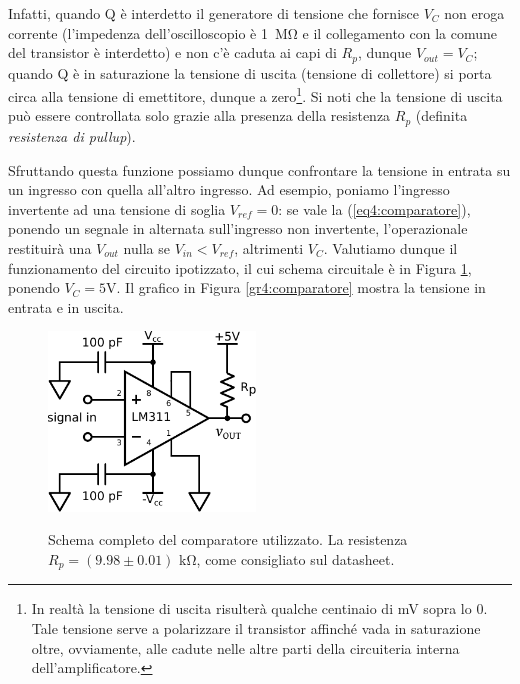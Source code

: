 Infatti, quando Q è interdetto il generatore di tensione che fornisce $V_C$ non eroga corrente (l'impedenza dell'oscilloscopio è \SI{1}{\Mohm} e il collegamento con la comune del transistor è interdetto) e non c'è caduta ai capi di $R_p$, dunque $V_{out}=V_C$; quando Q è in saturazione la tensione di uscita (tensione di collettore) si porta circa alla tensione di emettitore, dunque a zero\footnote{In realtà la tensione di uscita risulterà qualche centinaio di \si{\milli\volt} sopra lo $0$. Tale tensione serve a polarizzare il transistor affinché vada in saturazione oltre, ovviamente, alle cadute nelle altre parti della circuiteria interna dell'amplificatore.}. Si noti che la tensione di uscita può essere controllata solo grazie alla presenza della resistenza $R_p$ (definita \textit{resistenza di pullup}).

Sfruttando questa funzione possiamo dunque confrontare la tensione in entrata su un ingresso con quella all'altro ingresso. Ad esempio, poniamo l'ingresso invertente ad una tensione di soglia $V_{ref}=0$: se vale la (\ref{eq4:comparatore}), ponendo un segnale in alternata sull'ingresso non invertente, l'operazionale restituirà una $V_{out}$ nulla se $V_{in}<V_{ref}$, altrimenti $V_C$. Valutiamo dunque il funzionamento del circuito ipotizzato, il cui schema circuitale è in Figura \ref{cir4:comparatore}, ponendo $V_{C}=5$\si{\volt}. Il grafico in Figura \ref{gr4:comparatore} mostra la tensione in entrata e in uscita.

\begin{figure}[ht]
 \centering
   {\includegraphics[width=5.5cm]{../E04/latex/c_comparatore.pdf}}
 \caption{Schema completo del comparatore utilizzato. La resistenza $R_p=(9.98 \pm 0.01)$ \si{\kilo\ohm}, come consigliato sul datasheet.}
 \label{cir4:comparatore}
\end{figure}

